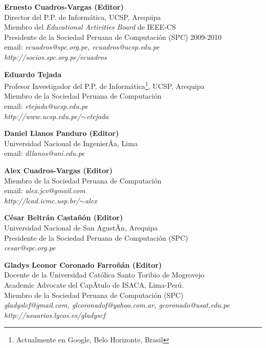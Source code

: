 \begin{center}
\textbf{Ernesto Cuadros-Vargas (Editor)}\\
Director del P.P. de Informática, UCSP, Arequipa\\
Miembro del \textit{Educational Activities Board} de IEEE-CS\\
Presidente de la Sociedad Peruana de Computación (SPC) 2009-2010\\
email: \textit{ecuadros@spc.org.pe, ecuadros@ucsp.edu.pe}\\
\textit{http://socios.spc.org.pe/ecuadros}
\end{center}

\begin{center}
\textbf{Eduardo Tejada}\\
Profesor Investigador del P.P. de Informática\footnote{Actualmente en Google, Belo Horizonte, Brasil}, UCSP, Arequipa\\
Miembro de la Sociedad Peruana de Computación\\
email: \textit{etejada@ucsp.edu.pe}\\
\textit{http://www.ucsp.edu.pe/$\sim$etejada}
\end{center}

\begin{center}
\textbf{Daniel Llanos Panduro (Editor)}\\
Universidad Nacional de IngenierÃ­a, Lima\\
email: \textit{dllanos@uni.edu.pe}\\
\end{center}

\begin{center}
\textbf{Alex Cuadros-Vargas (Editor)}\\
Miembro de la Sociedad Peruana de Computación\\
email: \textit{alex.jcv@gmail.com}\\
\textit{http://lcad.icmc.usp.br/$\sim$alex}
\end{center}

\begin{center}
\textbf{César Beltrán Castañón (Editor)}\\
Universidad Nacional de San AgustÃ­n, Arequipa\\
Presidente de la Sociedad Peruana de Computación (SPC)\\
\textit{cesar@spc.org.pe}
\end{center}

\begin{center}
\textbf{Gladys Leonor Coronado Farroñán (Editor)}\\
Docente de la Universidad Católica Santo Toribio de Mogrovejo\\
Academic Advocate del CapÃ­tulo de ISACA, Lima-Perú.\\
Miembro de la Sociedad Peruana de Computación (SPC)\\
\textit{gladyslcf@gmail.com, glcoronadof@yahoo.com.ar, gcoronado@usat.edu.pe}\\
\textit{http://usuarios.lycos.es/gladyscf}
\end{center}

